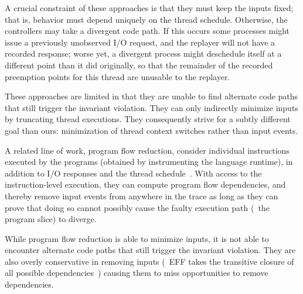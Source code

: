 A crucial constraint of these approaches is that they must keep the inputs
fixed; that is, behavior must depend uniquely on the thread
schedule. Otherwise, the controllers may take a divergent code path. If this
occurs some processes might issue a previously unobserved I/O request, and the replayer will not
have a recorded response; worse yet, a divergent process might deschedule
itself at a different point than it did originally, so that the remainder of
the recorded preemption points for this thread are unusable to the replayer.

These approaches are limited in that they are
unable to find alternate code paths that still
trigger the invariant violation. They can only indirectly
minimize inputs by truncating thread executions.
They consequently strive for a subtly different goal than ours:
minimization of thread context switches rather than input events.


A related line of work, program flow reduction,
consider individual instructions executed by the
programs (obtained by instrumenting the language runtime), in addition to I/O responses
and the thread schedule~\cite{Lee:2011:TGR:1993498.1993528, tallam2007enabling, huang2012lean}.
With access to the instruction-level execution, they can compute
program flow dependencies, and thereby remove input events from anywhere in the trace as long as they
can prove that doing so cannot possibly cause the faulty execution path (\ie~the program slice) to diverge.

While program flow reduction is able to minimize inputs,
it is not able to encounter alternate code paths that still
trigger the invariant violation. They are also overly conservative in
removing inputs (\eg~EFF takes the transitive closure of all possible
dependencies~\cite{Lee:2011:TGR:1993498.1993528}) causing them to miss opportunities to
remove dependencies.%

